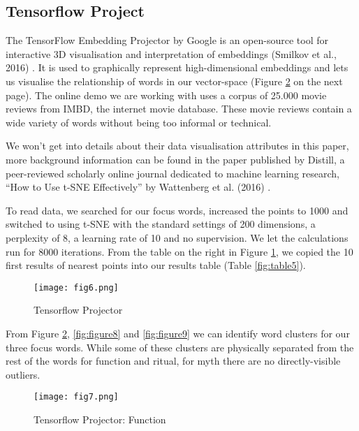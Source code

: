 \documentclass[12pt, usenames, dvipsnames]{report}
\begin{document}
\begin{flushleft}
\subsection{Tensorflow Project}

The TensorFlow Embedding Projector by Google is an open-source tool for interactive 3D visualisation and interpretation of embeddings (Smilkov et al., 2016) \cite{smilkov2016}.
It is used to graphically represent high-dimensional embeddings and lets us visualise the relationship of words in our vector-space (Figure \ref{fig:figure7} on the next page).
The online demo we are working with uses a corpus of 25.000 movie reviews from IMBD, the internet movie database.
These movie reviews contain a wide variety of words without being too informal or technical.

We won’t get into details about their data visualisation attributes in this paper, more background information can be found in the paper published by Distill, a peer-reviewed scholarly online journal dedicated to machine learning research, “How to Use t-SNE Effectively” by Wattenberg et al. (2016) \cite{wattenberg2016}.

To read data, we searched for our focus words, increased the points to 1000 and switched to using t-SNE with the standard settings of 200 dimensions, a perplexity of 8, a learning rate of 10 and no supervision.
We let the calculations run for 8000 iterations.
From the table on the right in Figure \ref{fig:figure6}, we copied the 10 first results of nearest points into our results table (Table \ref{fig:table5}).

\vspace*{1.2em}
\begin{figure}[!htbp]
  \hspace*{-3.666em}
  \texttt{[image: fig6.png]}
  \caption{Tensorflow Projector}
  \label{fig:figure6}
\end{figure}
\vspace*{1.2em}

From Figure \ref{fig:figure7}, \ref{fig:figure8} and \ref{fig:figure9} we can identify word clusters for our three focus words.
While some of these clusters are physically separated from the rest of the words for function and ritual, for myth there are no directly-visible outliers.

\vspace*{1.2em}
\begin{figure}[!htbp]
  \hspace*{-3.666em}
  \texttt{[image: fig7.png]}
  \caption{Tensorflow Projector: Function}
  \label{fig:figure7}
\end{figure}
\vspace*{1.2em}


\end{flushleft}
\end{document}
